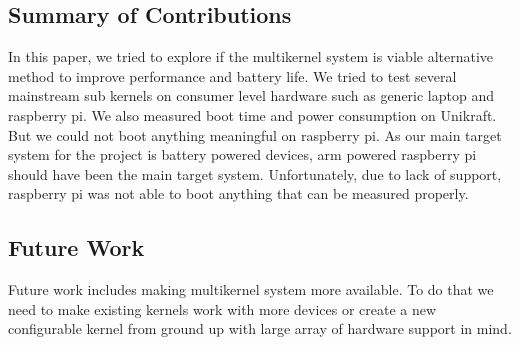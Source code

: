 \documentclass[11pt]{article}       %
\begin{document}
\subsection{Summary of Contributions}
In this paper, we tried to explore if the multikernel system is viable alternative method to improve performance and battery life. We tried to test several mainstream sub kernels on consumer level hardware such as generic laptop and raspberry pi. We also measured boot time and power consumption on Unikraft. But we could not boot anything meaningful on raspberry pi. As our main target system for the project is battery powered devices, arm powered raspberry pi should have been the main target system. Unfortunately, due to lack of support, raspberry pi was not able to boot anything that can be measured properly.
\subsection{Future Work}
Future work includes making multikernel system more available. To do that we need to make existing kernels work with more devices or create a new configurable kernel from ground up with large array of hardware support in mind.




\end{document}
